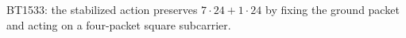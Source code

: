\begin{center}\small
BT1533: the stabilized action preserves $7\cdot24+1\cdot24$ by fixing the ground packet and acting on a four-packet square subcarrier.
\end{center}
